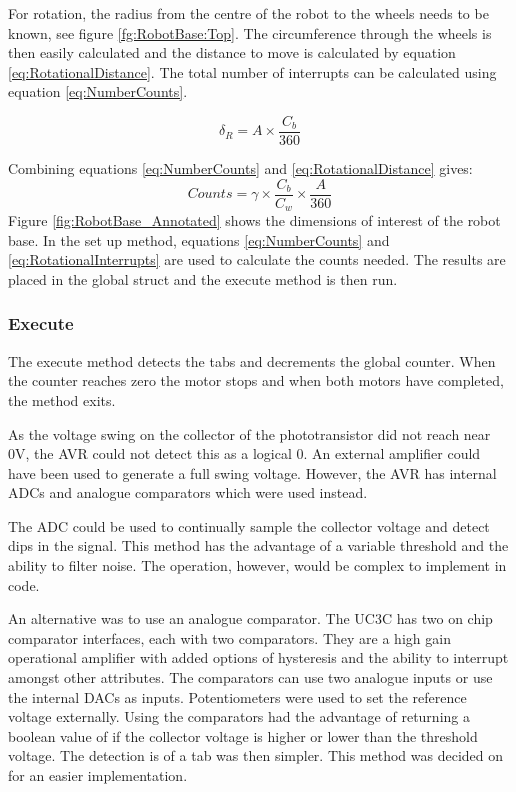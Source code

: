 For rotation, the radius from the centre of the robot to the wheels needs to be known, see figure \ref{fg:RobotBase:Top}. The circumference through the wheels is then easily calculated and the distance to move is calculated by equation \eqref{eq:RotationalDistance}. The total number of interrupts can be calculated using equation \eqref{eq:NumberCounts}. 

\begin{equation}
\label{eq:RotationalDistance}
\delta_{R} = A \times \frac{C_b}{360}
\end{equation}

Combining equations \eqref{eq:NumberCounts} and \eqref{eq:RotationalDistance} gives:
\begin{equation}
\label{eq:RotationalInterrupts}
Counts = \gamma \times \frac{C_b}{C_w} \times \frac{A}{360}
\end{equation}
Figure \ref{fig:RobotBase_Annotated} shows the dimensions of interest of the robot base. In the set up method, equations \eqref{eq:NumberCounts} and \eqref{eq:RotationalInterrupts} are used to calculate the counts needed. The results are placed in the global struct and the execute method is then run.

\subsubsection{Execute}

The execute method detects the tabs and decrements the global counter. When the counter reaches zero the motor stops and when both motors have completed, the method exits.

As the voltage swing on the collector of the phototransistor did not reach near 0V, the AVR could not detect this as a logical 0. An external amplifier could have been used to generate a full swing voltage. However, the AVR has internal ADCs and analogue comparators which were used instead. 

The ADC could be used to continually sample the collector voltage and detect dips in the signal. This method has the advantage of a variable threshold and the ability to filter noise. The operation, however, would be complex to implement in code. 

An alternative was to use an analogue comparator. The UC3C has two on chip comparator interfaces, each with two comparators. They are a high gain operational amplifier with added options of hysteresis and the ability to interrupt amongst other attributes. The comparators can use two analogue inputs or use the internal DACs as inputs. Potentiometers were used to set the reference voltage externally. Using the comparators had the advantage of returning a boolean value of if the collector voltage is higher or lower than the threshold voltage. The detection is of a tab was then simpler. This method was decided on for an easier implementation.

